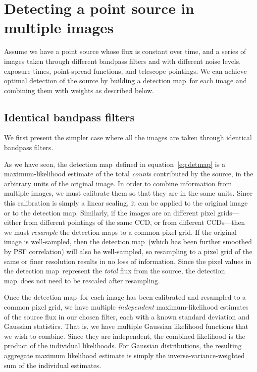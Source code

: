 \documentclass[letterpaper,preprint]{aastex}
\newcommand{\equationname}{equation}
\newcommand{\eqnref}[1]{\mbox{\equationname~\ref{#1}}}
\newcommand{\detmap}{detection map}
\begin{document}
\section{Detecting a point source in multiple images}

Assume we have a point source whose flux is constant over time, and a
series of images taken through different bandpass filters and with
different noise levels, exposure times, point-spread functions, and
telescope pointings.  We can achieve optimal detection of the source
by building a \detmap\ for each image and combining them with weights
as described below.



\subsection{Identical bandpass filters}

We first present the simpler case where all the images are taken
through identical bandpass filters.

As we have seen, the \detmap\ defined in \eqnref{eq:detmap} is a
maximum-likelihood estimate of the total \emph{counts} contributed by
the source, in the arbitrary units of the original image.  In order to
combine information from multiple images, we must calibrate them so
that they are in the same units.  Since this calibration is simply a
linear scaling, it can be applied to the original image or to the
\detmap.  Similarly, if the images are on different pixel
grids---either from different pointings of the same CCD, or from
different CCDs---then we must \emph{resample} the \detmap s to a
common pixel grid.
%
If the original image is well-sampled, then the \detmap\ (which has
been further smoothed by PSF correlation) will also be well-sampled,
so resampling to a pixel grid of the same or finer resolution results
in no loss of information.
%
Since the pixel values in the \detmap\ represent the \emph{total} flux
from the source, the \detmap\ does not need to be rescaled after
resampling.


Once the \detmap\ for each image has been calibrated and resampled to
a common pixel grid, we have multiple \emph{independent}
maximum-likelihood estimates of the source flux in our chosen filter,
each with a known standard deviation and Gaussian statistics.  That
is, we have multiple Gaussian likelihood functions that we wish to
combine.  Since they are independent, the combined likelihood is the
product of the individual likelihoods.  For Gaussian distributions,
the resulting aggregate maximum likelihood estimate is simply the
inverse-variance-weighted sum of the individual estimates.
\end{document}
